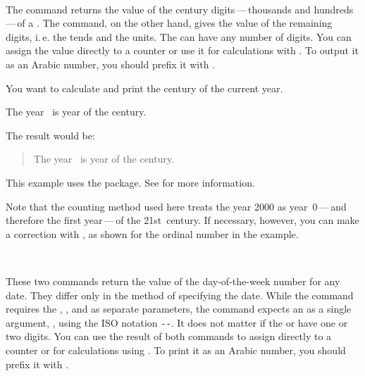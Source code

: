 \begin{Declaration}
  \\%
\end{Declaration}%
The  command returns
the value of the century digits\,---\,thousands and hundreds\,---\,of a
. The  command, on the other hand, gives the
value of the remaining digits, i.\,e. the tends and the units. The
 can have any number of digits. You can assign the value directly
to a counter or use it for calculations with
. To output it as an
Arabic number, you should prefix it with .

\begin{Example}
  You want to calculate and print the century of the current year.
\begin{lstcode}
  The year \the\year\ is year \the\DecadePart{\year}
  of the \engord{\numexpr\CenturyPart{\year}+1\relax} century.
\end{lstcode}
  The result would be:
  \begin{quote}
    The year \the\year\ is year \the\DecadePart{\year}
    of the \engordnumber{\numexpr\CenturyPart{\year}+1\relax} century.
  \end{quote}
  This example uses the  package.
  See \cite{package:engord} for more information.
\end{Example}

Note that the counting method used here treats the year
2000 as year~0\,---\,and therefore the first year\,---\,of the 21st~century.
If necessary, however, you can make a correction with , as
shown for the ordinal number in the example.%
\EndIndexGroup


\begin{Declaration}
  \\%
\end{Declaration}%
These two commands return the value of
the day-of-the-week number for any date. They differ
only in the method of specifying the date. While the  command
requires the , , and  as separate
parameters, the  command expects an  as a
single argument, , using the ISO notation
\texttt{-}\texttt{-}. It does not matter
if the  or  have one or two digits. You can use the
result of both commands to assign directly to a counter or for calculations
using . To print it as
an Arabic number, you should prefix it with .

